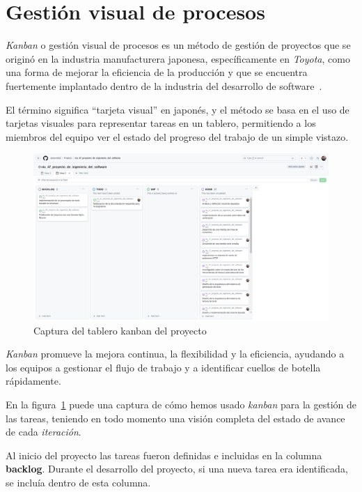 \section{Gestión visual de procesos}

\textit{Kanban} o gestión visual de procesos es un método de gestión de proyectos que se originó en la industria
manufacturera japonesa, específicamente en \textit{Toyota}, como una forma de mejorar la eficiencia de la producción y
que se encuentra fuertemente implantado dentro de la industria del desarrollo de software~\cite{book_anderson_2010}.

El término significa ``tarjeta visual'' en japonés, y el método se basa en el uso de tarjetas visuales para
representar tareas en un tablero, permitiendo a los miembros del equipo ver el estado del progreso del trabajo de un
simple vistazo.

\begin{figure}[ht]
    \begin{center}
        \includegraphics[width=\textwidth]{./chapter/3/images/chapter_3.kanban}
        \caption{Captura del tablero kanban del proyecto}
        \label{fig:chapter_3.kanban}
    \end{center}
\end{figure}

\textit{Kanban} promueve la mejora continua, la flexibilidad y la eficiencia, ayudando a los equipos a gestionar el
flujo de trabajo y a identificar cuellos de botella rápidamente.

En la figura~\ref{fig:chapter_3.kanban} puede una captura de cómo hemos usado \textit{kanban} para la gestión de las
tareas, teniendo en todo momento una visión completa del estado de avance de cada \textit{iteración}.

Al inicio del proyecto las tareas fueron definidas e incluidas en la columna \textbf{backlog}.
Durante el desarrollo del proyecto, si una nueva tarea era identificada, se incluía dentro de esta columna.

